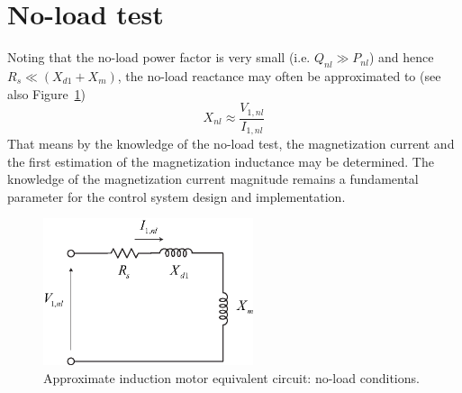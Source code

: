\documentclass[11pt,a4paper,oneside]{book}
\numberwithin{equation}{section}
\theoremstyle{it}
\theoremstyle{definition}
\begin{document}
\section{No-load test}
Noting that the no-load power factor is very small (i.e. $Q_{nl} \gg P_{nl}$) and hence $R_s \ll (X_{d1}+X_m)$, the no-load reactance may often be approximated to (see also Figure~\ref{no_load_test})
\begin{equation} \label{eq18}
	X_{nl} \approx \frac{V_{1,nl}}{I_{1,nl}}
\end{equation} 
That means by the knowledge of the no-load test, the magnetization current and the first estimation of the magnetization inductance may be determined. The knowledge of the magnetization current magnitude remains a fundamental parameter for the control system design and implementation.
\begin{figure}[H]
	\centering
	\includegraphics[width = 175pt, keepaspectratio]{figures/no_load_test.eps}
	\captionsetup{width=0.5\textwidth, font=small}
	\caption{Approximate induction motor equivalent circuit: no-load conditions.}
	\label{no_load_test} 
\end{figure}
\end{document}
